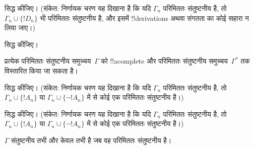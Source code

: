 \documentclass[../../../include/open-logic-section]{subfiles}
\begin{document}
\begin{prob}
 सिद्ध कीजिए। (संकेत: निर्णायक चरण यह
दिखाना है कि यदि $\Gamma_n$ परिमिततः संतुष्टनीय है, तो $\Gamma_n
\cup \{!D_n\}$ भी परिमिततः संतुष्टनीय है, और इसमें !!{derivation}s अथवा
संगतता का कोई सहारा न लिया जाए।)
\end{prob}
\tagendprob


\begin{prob}
 सिद्ध कीजिए।
\end{prob}
\tagendprob

\begin{lem}
 प्रत्येक परिमिततः संतुष्टनीय समुच्चय~$\Gamma$
को !!a{complete} और परिमिततः संतुष्टनीय समुच्चय~$\Gamma^*$ तक विस्तारित
किया जा सकता है।
\end{lem}

\begin{prob}
 सिद्ध कीजिए। (संकेत: निर्णायक
चरण यह दिखाना है कि यदि $\Gamma_n$ परिमिततः संतुष्टनीय है, तो
$\Gamma_n \cup \{!A_n\}$ या $\Gamma_n \cup \{\lnot !A_n\}$ में से कोई एक
परिमिततः संतुष्टनीय है।)
\end{prob}
\tagendprob

\begin{prob}
 सिद्ध कीजिए। (संकेत: निर्णायक
चरण यह दिखाना है कि यदि $\Gamma_n$ परिमिततः संतुष्टनीय है, तो
$\Gamma_n \cup \{!A_n\}$ या $\Gamma_n \cup \{\lnot !A_n\}$ में से कोई एक
परिमिततः संतुष्टनीय है।)
\end{prob}
\tagendprob

\begin{thm}[संहतता]
 $\Gamma$ संतुष्टनीय तभी और केवल तभी है जब
वह परिमिततः संतुष्टनीय है।
\end{thm}
\end{document}
